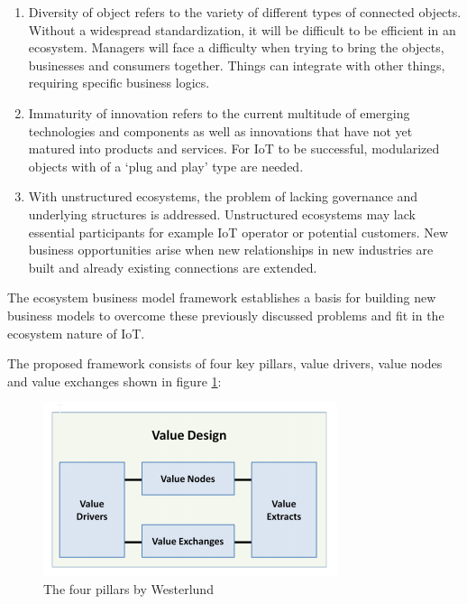 		\begin{enumerate}
			\item Diversity of object refers to the variety of different types of connected objects. Without a widespread standardization, it will be difficult to be efficient in an ecosystem. Managers will face a difficulty when trying to bring the objects, businesses and consumers together. Things can integrate with other things, requiring specific business logics.

			\item Immaturity of innovation refers to the current multitude of emerging technologies and components as well as innovations that have not yet matured into products and services. For IoT to be successful, modularized objects with of a `plug and play' type are needed.

			\item With unstructured ecosystems, the problem of lacking governance and underlying structures is addressed. Unstructured ecosystems may lack essential participants for example IoT operator or potential customers. New business opportunities arise when new relationships in new industries are built and already existing connections are extended.
		\end{enumerate}

		The ecosystem business model framework establishes a basis for building new business models to overcome these previously discussed problems and fit in the ecosystem nature of IoT. 

		The proposed framework consists of four key pillars, value drivers, value nodes and value exchanges shown in figure \ref{Westerlund pillars}:

			\begin{figure}[ht]
			    \begin{center}
			    \includegraphics[scale=1.0]{Talk11/westerlundpillars.png}
			    \end{center}
			    \caption{The four pillars by Westerlund~\cite[p.11]{westerlund}}
			    \label{Westerlund pillars}
			\end{figure}

